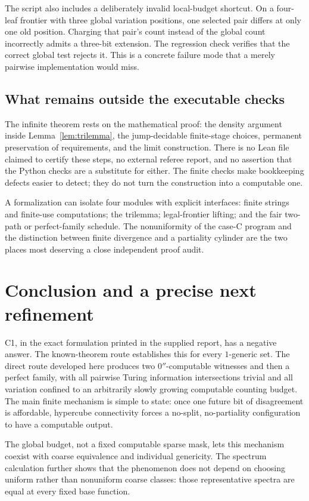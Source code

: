 \documentclass[11pt,a4paper]{article}
\theoremstyle{definition}\newtheorem{definition}[theorem]{Definition}
\theoremstyle{remark}\newtheorem{remark}[theorem]{Remark}
\begin{document}
The script also includes a deliberately invalid local-budget shortcut.
On a four-leaf frontier with three global variation positions, one selected
pair differs at only one old position. Charging that pair's count instead of
the global count incorrectly admits a three-bit extension. The regression
check verifies that the correct global test rejects it. This is a concrete
failure mode that a merely pairwise implementation would miss.

\subsection{What remains outside the executable checks}
The infinite theorem rests on the mathematical proof: the density argument
inside Lemma~\ref{lem:trilemma}, the jump-decidable finite-stage choices,
permanent preservation of requirements, and the limit construction.
There is no Lean file claimed to certify these steps, no external referee
report, and no assertion that the Python checks are a substitute for either.
The finite checks make bookkeeping defects easier to detect; they do not
turn the construction into a computable one.

A formalization can isolate four modules with explicit interfaces: finite
strings and finite-use computations; the trilemma; legal-frontier lifting;
and the fair two-path or perfect-family schedule. The nonuniformity of the
case-C program and the distinction between finite divergence and a
partiality cylinder are the two places most deserving a close independent
proof audit.

\section{Conclusion and a precise next refinement}

C1, in the exact formulation printed in the supplied report, has a negative
answer. The known-theorem route establishes this for every $1$-generic set.
The direct route developed here produces two $0''$-computable witnesses and
then a perfect family, with all pairwise Turing information intersections
trivial and all variation confined to an arbitrarily slowly growing
computable counting budget. The main finite mechanism is simple to state:
once one future bit of disagreement is affordable, hypercube connectivity
forces a no-split, no-partiality configuration to have a computable output.

The global budget, not a fixed computable sparse mask, lets this mechanism
coexist with coarse equivalence and individual genericity. The spectrum
calculation further shows that the phenomenon does not depend on choosing
uniform rather than nonuniform coarse classes: those representative spectra
are equal at every fixed base function.
\end{document}
